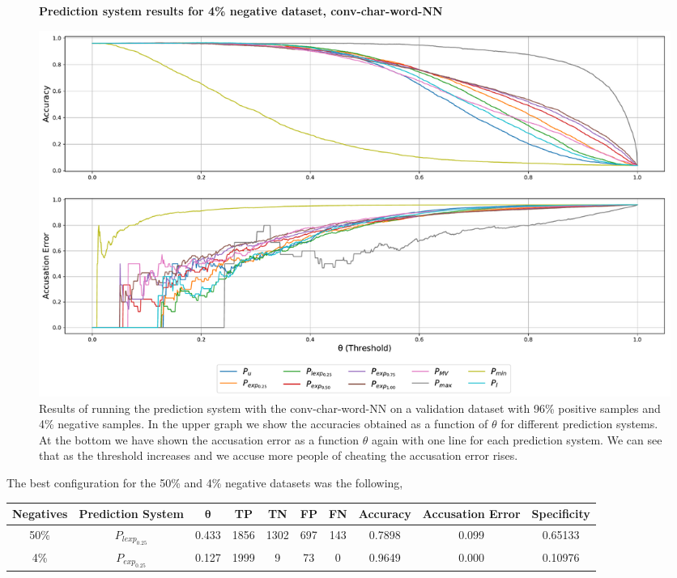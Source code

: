\begin{figure}
    \centering
    \textbf{Prediction system results for 4\% negative dataset, \gls{conv-char-word-NN}}\par\medskip
    \includegraphics[scale=0.33]{./pictures/experiments/conv_char_word_nn/prediction_system_04}
    \caption{Results of running the prediction system with the
        \gls{conv-char-word-NN} on a validation dataset with 96\% positive
        samples and 4\% negative samples. In the upper graph we show the
        accuracies obtained as a function of $\theta$ for different prediction
        systems. At the bottom we have shown the accusation error as a function
        $\theta$ again with one line for each prediction system. We can see that
        as the threshold increases and we accuse more people of cheating the
        accusation error rises.}
    \label{fig:conv-char-word-NN-pred-4}
\end{figure}

The best configuration for the 50\% and 4\% negative datasets was the
following,

\begin{center}
    \begin{adjustbox}{center}
    \scriptsize
    \begin{tabular}{|c|c|c|c|c|c|c|c|c|c|}
        \hline
        \textbf{Negatives} & \textbf{Prediction System} & $\mathbf{\theta}$ & \textbf{TP} & \textbf{TN} & \textbf{FP} & \textbf{FN} &
        \textbf{Accuracy} & \textbf{Accusation Error} & \textbf{Specificity}
        \\ \hline
        50\%      & $P_{lexp_{0.25}}$ & 0.433    & 1856 & 1302 & 697 & 143 &
        0.7898    & 0.099 & 0.65133
        \\ \hline
        4\%       & $P_{exp_{0.25}}$  & 0.127    & 1999 & 9    & 73  & 0   &
        0.9649    & 0.000 & 0.10976
        \\ \hline
    \end{tabular}
    \end{adjustbox}
\end{center}


